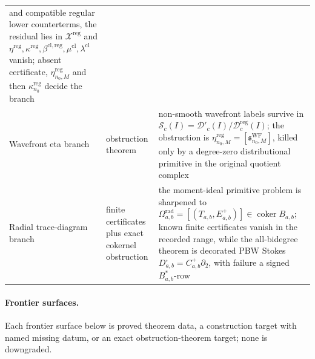 \begin{center}
\begin{tabular}{p{}p{}p{}}
and compatible regular lower counterterms, the residual lies in
\(\mathcal X^{\mathrm{reg}}\) and
\(\eta^{\mathrm{reg}},\kappa^{\mathrm{reg}},\beta^{\mathrm{cl,reg}},
\mu^{\mathrm{cl}},\lambda^{\mathrm{cl}}\) vanish; absent certificate,
\(\eta^{\mathrm{reg}}_{n_0,M}\) and then
\(\kappa^{\mathrm{reg}}_{n_0}\) decide the branch\\
Wavefront eta branch & obstruction theorem &
non-smooth wavefront labels survive in
\(\mathcal S_c(I)=\mathcal D'_c(I)/\mathcal D^{\mathrm{reg}}_c(I)\);
the obstruction is
\(\eta^{\mathrm{reg}}_{n_0,M}
=[\mathfrak s^{\mathrm{WF}}_{n_0,M}]\), killed only by a degree-zero
distributional primitive in the original quotient complex\\
Radial trace-diagram branch & finite certificates plus exact cokernel
obstruction &
the moment-ideal primitive problem is sharpened to
\(\Omega^{\mathrm{rad}}_{a,b}
=[(T_{a,b},E^+_{a,b})]\in\operatorname{coker}B_{a,b}\);
known finite certificates vanish in the recorded range, while the
all-bidegree theorem is decorated PBW Stokes
\(D^\square_{a,b}=C^+_{a,b}\partial_2\), with failure a signed
\(B^*_{a,b}\)-row\\
\end{tabular}
\end{center}

\medskip
\paragraph{Frontier surfaces.}
Each frontier surface below is proved theorem data, a construction
target with named missing datum, or an exact obstruction-theorem
target; none is downgraded.

